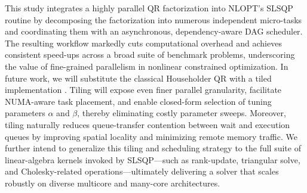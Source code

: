 This study integrates a highly parallel QR factorization into NLOPT’s SLSQP routine by decomposing the factorization into numerous independent micro-tasks and coordinating them with an asynchronous, dependency-aware DAG scheduler. The resulting workflow markedly cuts computational overhead and achieves consistent speed-ups across a broad suite of benchmark problems, underscoring the value of fine-grained parallelism in nonlinear constrained optimization.
In future work, we will substitute the classical Householder QR with a tiled implementation \cite{buttari2008parallel}\cite{baskaran2009compiler}\cite{dathathri2016compiling}. Tiling will expose even finer parallel granularity, facilitate NUMA-aware task placement, and enable closed-form selection of tuning parameters $\alpha$ and $\beta$, thereby eliminating costly parameter sweeps. Moreover, tiling naturally reduces queue-transfer contention between wait and execution queues by improving spatial locality and minimizing remote memory traffic.
We further intend to generalize this tiling and scheduling strategy to the full suite of linear-algebra kernels invoked by SLSQP—such as rank-update, triangular solve, and Cholesky-related operations—ultimately delivering a solver that scales robustly on diverse multicore and many-core architectures.



